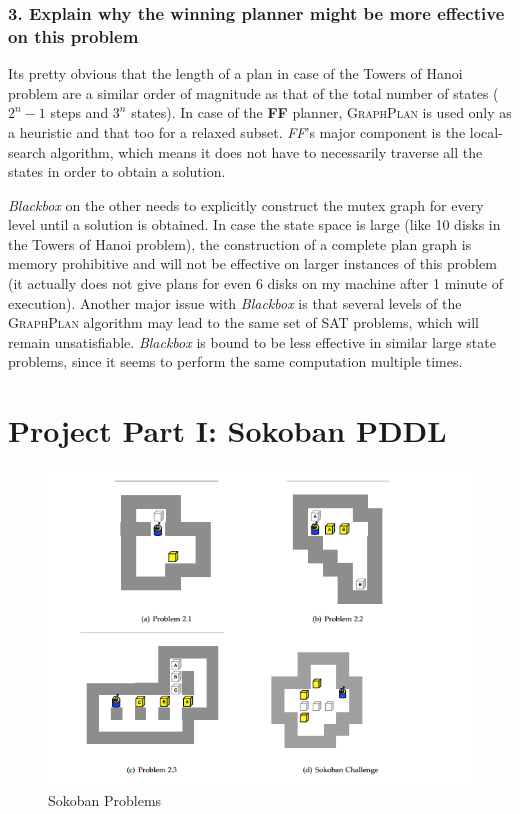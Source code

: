\documentclass[10pt, letter]{article}
\begin{document}
\subsubsection*{3. Explain why the winning planner might be more effective on this problem}
Its pretty obvious that the length of a plan in case of the Towers of Hanoi problem are a similar order of magnitude as that of the total number of states ($2^n - 1$ steps and $3^n$ states). In case of the \textbf{FF} planner, \textsc{GraphPlan} is used only as a heuristic and that too for a relaxed subset. \textit{FF}'s major component is the local-search algorithm, which means it does not have to necessarily traverse all the states in order to obtain a solution.

\textit{Blackbox} on the other needs to explicitly construct the mutex graph for every level until a solution is obtained. In case the state space is large (like 10 disks in the Towers of Hanoi problem), the construction of a complete plan graph is memory prohibitive and will not be effective on larger instances of this problem (it actually does not give plans for even 6 disks on my machine after 1 minute of execution). Another major issue with \textit{Blackbox} is that several levels of the \textsc{GraphPlan} algorithm may lead to the same set of SAT problems, which will remain unsatisfiable. \textit{Blackbox} is bound to be less effective in similar large state problems, since it seems to perform the same computation multiple times.


\section{Project Part I: Sokoban PDDL}

\begin{figure}[h]
  \centering
    \includegraphics[scale = 0.5]{images/sokoban}
    \caption{Sokoban Problems}
  \label{fig2}
\end{figure}
\end{document}
